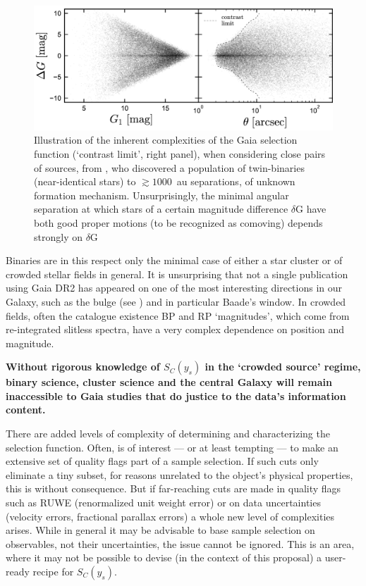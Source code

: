 \begin{figure}[ht!]
    \centering
    \includegraphics[width=0.7\linewidth]{img/BinarySelection_ElBadry.png}
    \caption{Illustration of the inherent complexities of the Gaia selection function (`contrast limit', right panel), when considering close pairs of sources, from \citet{ElBadry2019}, who discovered a population of twin-binaries (near-identical stars) to $\gtrsim 1000$~au separations, of unknown formation mechanism.
    Unsurprisingly, the minimal angular separation at which stars of a certain magnitude difference $\delta$G have both good proper motions (to be recognized as comoving) depends strongly on $\delta$G}
    \label{fig:binaries}
\end{figure}

Binaries are in this respect only the minimal case of either a star cluster or of crowded stellar fields in general. It is unsurprising that not a single publication using Gaia DR2 has appeared on one of the most interesting directions in our Galaxy, such as the bulge (see ) and in particular Baade's window. In crowded fields, often the catalogue existence BP and RP `magnitudes', which come from re-integrated slitless spectra, have a very complex dependence on position and magnitude.

\textbf{Without rigorous knowledge of $S_C(y_s)$ in the `crowded source' regime, binary science, cluster science and the central Galaxy will remain inaccessible to Gaia studies that do justice to the data's information content.}

There are added levels of complexity of determining and characterizing the selection function. Often, is of interest --- or at least tempting --- to make an extensive set of quality flags part of a sample selection. If such cuts only eliminate a tiny subset, for reasons unrelated to the object's physical properties, this is without consequence. But if far-reaching cuts are made in quality flags such as RUWE (renormalized unit weight error) or on data uncertainties (velocity errors, fractional parallax errors) a whole new level of complexities arises. While in general it may be advisable to base sample selection on observables, not their uncertainties, the issue cannot be ignored. This is an area, where it may not be possible to devise (in the context of this proposal) a user-ready recipe for $S_C(y_s)$.

